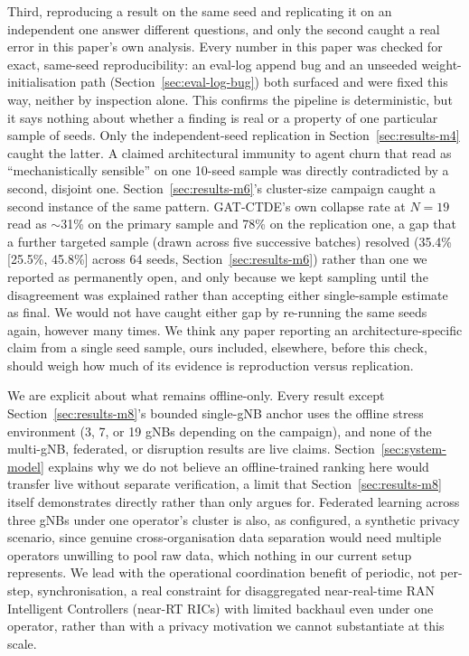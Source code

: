 \documentclass[journal]{IEEEtran}
\begin{document}
Third, reproducing a result on the same seed and replicating it on an
independent one answer different questions, and only the second caught
a real error in this paper's own analysis. Every number in this paper
was checked for exact, same-seed reproducibility: an eval-log append
bug and an unseeded weight-initialisation path
(Section~\ref{sec:eval-log-bug}) both surfaced and were fixed this
way, neither by inspection alone. This confirms the pipeline is
deterministic, but it says nothing about whether a finding is real or
a property of one particular sample of seeds. Only the independent-seed
replication in Section~\ref{sec:results-m4} caught the latter. A
claimed architectural immunity to agent churn that read as
``mechanistically sensible'' on one 10-seed sample was directly
contradicted by a second, disjoint one. Section~\ref{sec:results-m6}'s
cluster-size campaign caught a second instance of the same pattern.
GAT-CTDE's own collapse rate at $N=19$ read as $\sim$31\% on the
primary sample and 78\% on the replication one, a gap that a further
targeted sample (drawn across five successive batches) resolved
(35.4\% [25.5\%, 45.8\%] across 64 seeds,
Section~\ref{sec:results-m6}) rather than one we reported as
permanently open, and only because we kept sampling until the
disagreement was explained rather than accepting either single-sample
estimate as final. We would not have caught either gap by re-running
the same seeds again, however many times. We think any paper reporting
an architecture-specific claim from a single seed sample, ours
included, elsewhere, before this check, should weigh how much of its
evidence is reproduction versus replication.

We are explicit about what remains offline-only. Every result except
Section~\ref{sec:results-m8}'s bounded single-gNB anchor uses the
offline stress environment (3, 7, or 19 gNBs depending on the
campaign), and none of the multi-gNB, federated, or disruption results
are live claims. Section~\ref{sec:system-model} explains why we do not
believe an offline-trained ranking here would transfer live without
separate verification, a limit that Section~\ref{sec:results-m8}
itself demonstrates directly rather than only argues for. Federated
learning across three gNBs under one operator's cluster is also, as
configured, a synthetic privacy scenario, since genuine
cross-organisation data separation would need multiple operators
unwilling to pool raw data, which nothing in our current setup
represents. We lead with the operational coordination benefit of
periodic, not per-step, synchronisation, a real constraint for
disaggregated near-real-time RAN Intelligent Controllers (near-RT
RICs) with limited backhaul even under one operator, rather than with
a privacy motivation we cannot substantiate at this scale.
\end{document}
